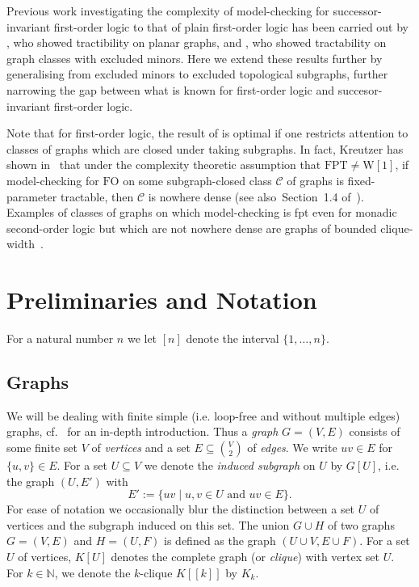 \documentclass[12pt]{amsart}
\newcommand{\suchthat}{\mathbin |}
\newcommand{\FO}{\textrm{FO}}
\newcommand{\N}{\mathds{N}}
\newcommand{\CCC}{\mathcal{C}} \newcommand{\DDD}{\mathcal{D}}
\begin{document}
Previous work investigating the complexity of model-checking for
successor-invariant first-order logic to that of plain first-order
logic has been carried out by \cite{EngelmannKS12}, who showed
tractibility on planar graphs, and \cite{ekk13}, who showed
tractability on graph classes with excluded minors. Here we extend
these results further by generalising from excluded minors to excluded
topological subgraphs, further narrowing the gap between what is known
for first-order logic and succesor-invariant first-order logic.

Note that for first-order logic, the result of \cite{gks14} is optimal
if one restricts attention to classes of graphs which are closed under
taking subgraphs. In fact, Kreutzer has shown in~\cite{Kreutzer11}
that under the complexity theoretic assumption that $\mathrm{FPT} \not
= \mathrm{W}[1]$, if model-checking for $\FO$ on some subgraph-closed
class $\CCC$ of graphs is fixed-parameter tractable, then $\CCC$ is
nowhere dense (see also~Section~1.4 of~\cite{DvorakKT13}). Examples of
classes of graphs on which model-checking is fpt even for monadic
second-order logic but which are not nowhere dense are graphs of
bounded clique-width~\cite{CourcelleMakRot00}.


\section{Preliminaries and Notation}
\label{sec:prelim}

For a natural number $n$ we let $[n]$ denote the interval
$\{1,\ldots,n\}$.

\subsection{Graphs}
\label{sec:graphprelim}

We will be dealing with finite simple (i.e. loop-free and without
multiple edges) graphs, cf.~\cite{diestel,tutte} for an in-depth
introduction. Thus a \emph{graph} $G = (V,E)$ consists of some finite
set $V$ of \emph{vertices} and a set $E \subseteq \binom{V}{2}$ of
\emph{edges}. We write $uv \in E$ for $\{u,v\} \in E$. For a set $U
\subseteq V$ we denote the \emph{induced subgraph} on $U$ by $G[U]$,
i.e. the graph $(U,E')$ with
\[
E' := \{ uv \suchthat u,v \in U\text{ and }uv \in E \}.
\]
For ease of notation we occasionally blur the distinction between a
set $U$ of vertices and the subgraph induced on this set. The union $G
\cup H$ of two graphs $G = (V,E)$ and $H = (U,F)$ is defined as the
graph $(U\cup V, E \cup F)$. For a set $U$ of vertices, $K[U]$ denotes
the complete graph (or \emph{clique}) with vertex set $U$. For $k \in
\N$, we denote the $k$-clique $K[[k]]$ by $K_k$.
\end{document}
